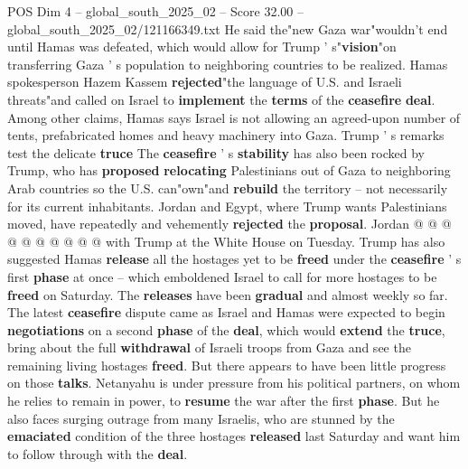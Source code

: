 \begin{textsample}{POS Dim 4 – global\_south\_2025\_02 – Score 32.00 – global\_south\_2025\_02/121166349.txt}
He said the"new Gaza war"wouldn't end until Hamas was defeated, which would allow for Trump ' s"\textbf{vision}"on transferring Gaza ' s population to neighboring countries to be realized.
Hamas spokesperson Hazem Kassem \textbf{rejected}"the language of U.S. and Israeli threats"and called on Israel to \textbf{implement} the \textbf{terms} of the \textbf{ceasefire} \textbf{deal}.
Among other claims, Hamas says Israel is not allowing an agreed-upon number of tents, prefabricated homes and heavy machinery into Gaza.
Trump ' s remarks test the delicate \textbf{truce} The \textbf{ceasefire} ' s \textbf{stability} has also been rocked by Trump, who has \textbf{proposed} \textbf{relocating} Palestinians out of Gaza to neighboring Arab countries so the U.S. can"own"and \textbf{rebuild} the territory -- not necessarily for its current inhabitants.
Jordan and Egypt, where Trump wants Palestinians moved, have repeatedly and vehemently \textbf{rejected} the \textbf{proposal}.
Jordan @ @ @ @ @ @ @ @ @ @ with Trump at the White House on Tuesday.
Trump has also suggested Hamas \textbf{release} all the hostages yet to be \textbf{freed} under the \textbf{ceasefire} ' s first \textbf{phase} at once -- which emboldened Israel to call for more hostages to be \textbf{freed} on Saturday.
The \textbf{releases} have been \textbf{gradual} and almost weekly so far.
The latest \textbf{ceasefire} dispute came as Israel and Hamas were expected to begin \textbf{negotiations} on a second \textbf{phase} of the \textbf{deal}, which would \textbf{extend} the \textbf{truce}, bring about the full \textbf{withdrawal} of Israeli troops from Gaza and see the remaining living hostages \textbf{freed}.
But there appears to have been little progress on those \textbf{talks}.
Netanyahu is under pressure from his political partners, on whom he relies to remain in power, to \textbf{resume} the war after the first \textbf{phase}.
But he also faces surging outrage from many Israelis, who are stunned by the \textbf{emaciated} condition of the three hostages \textbf{released} last Saturday and want him to follow through with the \textbf{deal}.

\end{textsample}
